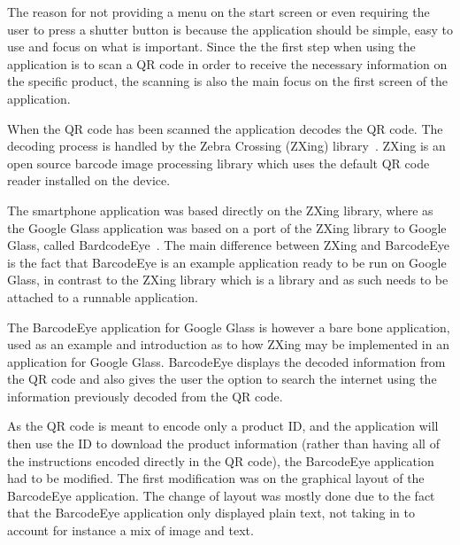 The reason for not providing a menu on the start screen or even requiring the user to press a shutter button is because the application should be simple, easy to use and focus on what is important. Since the the first step when using the application is to scan a QR code in order to receive the necessary information on the specific product, the scanning is also the main focus on the first screen of the application.

When the QR code has been scanned the application decodes the QR code. The decoding process is handled by the Zebra Crossing (ZXing) library~\cite{zxing}. ZXing is an open source barcode image processing library which uses the default QR code reader installed on the device.

The smartphone application was based directly on the ZXing library, where as the Google Glass application was based on a port of the ZXing library to Google Glass, called BardcodeEye~\cite{barcodeEye}. The main difference between ZXing and BarcodeEye is the fact that BarcodeEye is an example application ready to be run on Google Glass, in contrast to the ZXing library which is a library and as such needs to be attached to a runnable application.

The BarcodeEye application for Google Glass is however a bare bone application, used as an example and introduction as to how ZXing may be implemented in an application for Google Glass. BarcodeEye displays the decoded information from the QR code and also gives the user the option to search the internet using the information previously decoded from the QR code.

As the QR code is meant to encode only a product ID, and the application will then use the ID to download the product information (rather than having all of the instructions encoded directly in the QR code), the BarcodeEye application had to be modified. The first modification was on the graphical layout of the BarcodeEye application. The change of layout was mostly done due to the fact that the BarcodeEye application only displayed plain text, not taking in to account for instance a mix of image and text.

